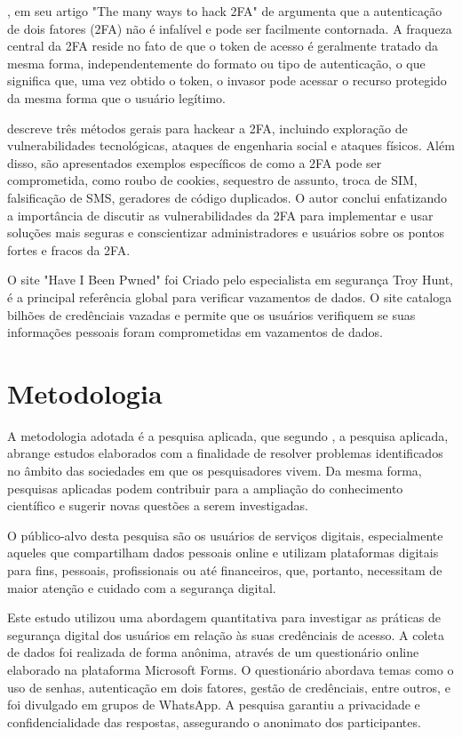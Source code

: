 \documentclass[12pt]{article}
\begin{document}
\cite{article:3}, em seu artigo "The many ways to hack 2FA" de argumenta que a
autenticação de dois fatores (2FA) não é infalível e pode ser facilmente
contornada.
A fraqueza central da 2FA reside no fato de que o token de acesso é
geralmente tratado da mesma forma, independentemente do formato ou tipo de
autenticação, o que significa que, uma vez obtido o token, o invasor pode
acessar o recurso protegido da mesma forma que o usuário legítimo.

\cite{article:3} descreve três métodos gerais para hackear a 2FA, incluindo
exploração de vulnerabilidades tecnológicas, ataques de engenharia social
e ataques físicos.
Além disso, são apresentados exemplos específicos de como a 2FA pode ser
comprometida, como roubo de cookies, sequestro de assunto, troca de SIM,
falsificação de SMS, geradores de código duplicados.
O autor conclui enfatizando a importância de discutir
as vulnerabilidades da 2FA para implementar e usar soluções mais seguras
e conscientizar administradores e usuários sobre os pontos fortes e fracos
da 2FA.

O site "Have I Been Pwned" \cite{hibp} foi Criado pelo especialista em segurança
Troy Hunt, é a principal referência global para verificar vazamentos de dados.
O site cataloga bilhões de credênciais vazadas e permite que os usuários verifiquem
se suas informações pessoais foram comprometidas em vazamentos de dados.

\section{Metodologia}

A metodologia adotada é a pesquisa aplicada, que segundo \cite{book:1}, a
pesquisa aplicada, abrange estudos elaborados com a finalidade de resolver
problemas identificados no âmbito das sociedades em que os pesquisadores
vivem.
Da mesma forma, pesquisas aplicadas podem contribuir para a ampliação do
conhecimento científico e sugerir novas questões a serem investigadas.

O público-alvo desta pesquisa são os usuários de serviços digitais,
especialmente aqueles que compartilham dados pessoais online e utilizam
plataformas digitais para fins, pessoais, profissionais ou até financeiros,
que, portanto, necessitam de maior atenção e cuidado com a segurança digital.

Este estudo utilizou uma abordagem quantitativa para investigar as práticas
de segurança digital dos usuários em relação às suas credênciais de acesso.
A coleta de dados foi realizada de forma anônima, através de um questionário
online elaborado na plataforma Microsoft Forms.
O questionário abordava temas como o uso de senhas, autenticação em dois
fatores, gestão de credênciais, entre outros, e foi divulgado em grupos de
WhatsApp.
A pesquisa garantiu a privacidade e confidencialidade das respostas,
assegurando o anonimato dos participantes.
\end{document}
